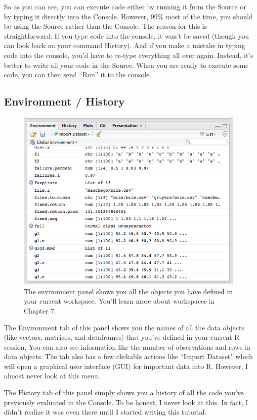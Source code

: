 \documentclass[]{book}
\theoremstyle{definition}
\theoremstyle{definition}
\theoremstyle{remark}
\begin{document}
So as you can see, you can execute code either by running it from the
Source or by typing it directly into the Console. However, 99\% most of
the time, you should be using the Source rather than the Console. The
reason for this is straightforward: If you type code into the console,
it won't be saved (though you can look back on your command History).
And if you make a mistake in typing code into the console, you'd have to
re-type everything all over again. Instead, it's better to write all
your code in the Source. When you are ready to execute some code, you
can then send ``Run'' it to the console.

\subsection{Environment / History}\label{environment-history}

\begin{figure}
\includegraphics[width=0.75\linewidth]{images/environmentss} \caption{The environment panel shows you all the objects you have defined in your current workspace. You'll learn more about workspaces in Chapter 7.}\label{fig:environment}
\end{figure}

The Environment tab of this panel shows you the names of all the data
objects (like vectors, matrices, and dataframes) that you've defined in
your current R session. You can also see information like the number of
observations and rows in data objects. The tab also has a few clickable
actions like ``Import Dataset" which will open a graphical user
interface (GUI) for important data into R. However, I almost never look
at this menu.

The History tab of this panel simply shows you a history of all the code
you've previously evaluated in the Console. To be honest, I never look
at this. In fact, I didn't realize it was even there until I started
writing this tutorial.
\end{document}
